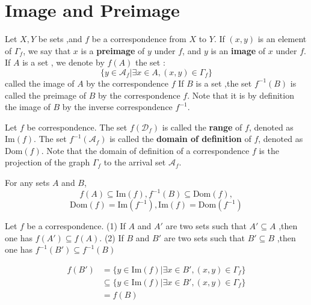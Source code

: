 \documentclass{book}
\numberwithin{equation}{section}
\begin{document}
\section{Image and Preimage}
\begin{definitionenv}
    Let $X,Y$ be sets ,and $f$ be a correspondence from $X$ to $Y$. If $(x,y)$ is an element of $\Gamma_f$, we say that $x$ is a \textbf{preimage } of $y$ under $f$, and $y$ is an \textbf{image} of $x$ under $f$.
    \newline
    If $A$ is a set , we denote by $f(A)$ the set :
    $$\{y\in \mathscr{A}_f|\exists x\in A ,(x,y)\in \Gamma_f\}$$
    called the image of $A$ by the correspondence $f$
    \newline 
    If $B$ is a set ,the set $f^{-1} (B)$ is called the preimage of $B$ by the correspondence $f$. Note that it is by definition the image of $B$ by the inverse correspondence $f^{-1}$.
\end{definitionenv}
\begin{definitionenv}
    Let $f$ be correspondence. The set $f(\mathscr{D}_f)$ is called the \textbf{range} of $f$, denoted as $\mathrm{Im} (f)$. The set $f^{-1}(\mathscr{A}_f)$ is called the \textbf{domain of definition }of $f$, denoted as $\mathrm{Dom}( f) $.
    Note that the domain of definition of a correspondence $f$ is the projection of the graph $\Gamma_f$ to the arrival set $\mathscr{A}_f$.
\end{definitionenv}
For any sets $ A$ and $B$,
$$f(A)\subseteq \mathrm{Im}(f),f^{-1}(B)\subseteq\mathrm{Dom}(f),$$
$$\mathrm{Dom}(f)=\mathrm{Im}(f^{-1}),\mathrm{Im }(f)=\mathrm{Dom}(f^{-1})$$
\begin{propositionenv}\label{proposition3.3.1}
    Let $f$ be a correspondence.
    \newline
    (1) If $A$ and $A'$ are two sets such that $A'\subseteq A$ ,then one has $f(A')\subseteq f(A)$.
    \newline
    (2) If $B$ and $B'$ are two sets such that $B'\subseteq B$ ,then one has $f^{-1}(B')\subseteq f^{-1}(B)$
\end{propositionenv}
\begin{proofenv}
    \begin{align*}
        f(B')&=\{y\in\mathrm{Im}(f)|\exists x\in B',(x,y)\in \Gamma_f\}\\
        &\subseteq\{y\in\mathrm{Im}(f)|\exists x\in B',(x,y)\in \Gamma_f\}\\
        &=f(B)
    \end{align*}
\end{proofenv}    
\end{document}
